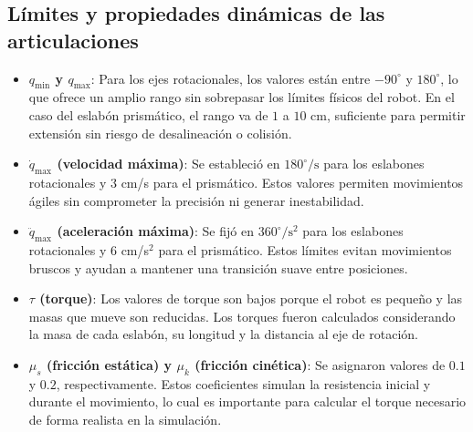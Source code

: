 \subsection{Límites y propiedades dinámicas de las articulaciones} \label{subsec:limites_propiedades}

\begin{itemize}
	\item \textbf{$q_\text{min}$ y $q_\text{max}$}: Para los ejes rotacionales, los valores están entre $-90^\circ$ y $180^\circ$, lo que ofrece un amplio rango sin sobrepasar los límites físicos del robot. En el caso del eslabón prismático, el rango va de $1$ a $10$ cm, suficiente para permitir extensión sin riesgo de desalineación o colisión.
	
	\item \textbf{$\dot{q}_\text{max}$ (velocidad máxima)}: Se estableció en $180^\circ/\text{s}$ para los eslabones rotacionales y $3$ cm/s para el prismático. Estos valores permiten movimientos ágiles sin comprometer la precisión ni generar inestabilidad.
	
	\item \textbf{$\ddot{q}_\text{max}$ (aceleración máxima)}: Se fijó en $360^\circ/\text{s}^2$ para los eslabones rotacionales y $6$ cm/s$^2$ para el prismático. Estos límites evitan movimientos bruscos y ayudan a mantener una transición suave entre posiciones.
	
	\item \textbf{$\tau$ (torque)}: Los valores de torque son bajos porque el robot es pequeño y las masas que mueve son reducidas. Los torques fueron calculados considerando la masa de cada eslabón, su longitud y la distancia al eje de rotación.
	
	\item \textbf{$\mu_s$ (fricción estática) y $\mu_k$ (fricción cinética)}: Se asignaron valores de $0.1$ y $0.2$, respectivamente. Estos coeficientes simulan la resistencia inicial y durante el movimiento, lo cual es importante para calcular el torque necesario de forma realista en la simulación.
\end{itemize}
